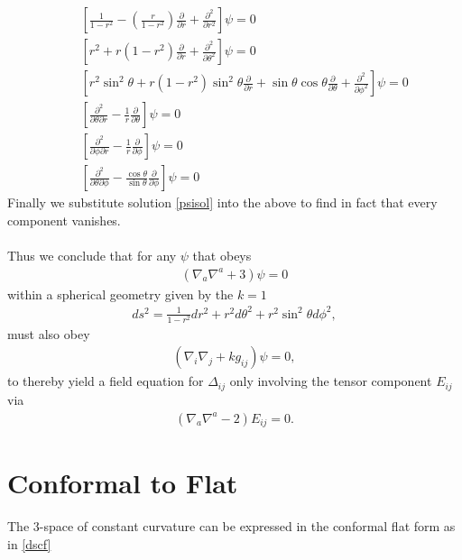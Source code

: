 \documentclass[10pt,letterpaper]{article}
\numberwithin{equation}{section}
\begin{document}
\begin{eqnarray}
&&\left[ \frac{1}{1-r^2}- \left(\frac{r}{1-r^2}\right)\frac{\partial}{\partial r} + \frac{\partial^2}{\partial r^2}\right]\psi
=0
\nonumber\\
&& \left[ r^2+r(1-r^2)\frac{\partial}{\partial r}+\frac{\partial^2}{\partial\theta^2}\right]\psi =0
\nonumber\\
&& \left[ r^2\sin^2\theta+r(1-r^2)\sin^2\theta\frac{\partial}{\partial r} + \sin\theta\cos\theta \frac{\partial}{\partial\theta} + \frac{\partial^2}{\partial \phi^2}\right]\psi=0
\nonumber\\
&& \left[ \frac{\partial^2}{\partial\theta\partial r}-\frac{1}{r}\frac{\partial}{\partial \theta}\right]\psi=0
\nonumber\\
&& \left[ \frac{\partial^2}{\partial\phi\partial r}-\frac{1}{r}\frac{\partial}{\partial \phi}\right]\psi=0
\nonumber\\
&& \left[ \frac{\partial^2}{\partial\theta\partial\phi}-\frac{\cos\theta}{\sin\theta}\frac{\partial}{\partial \phi}\right]\psi =0
\end{eqnarray}
Finally we substitute solution \eqref{psisol} into the above to find in fact that every component vanishes. 
\\
\\Thus we conclude that for any $\psi$ that obeys
\begin{eqnarray}
(\nabla_a\nabla^a+3)\psi=0
\end{eqnarray}
within a spherical geometry given by the $k=1$ 
\begin{eqnarray}
ds^2 = \frac{1}{1-r^2}dr^2+r^2d\theta^2 +r^2\sin^2\theta d\phi^2,
\end{eqnarray}
must also obey
\begin{eqnarray}
(\nabla_i\nabla_j +k g_{ij})\psi=0,
\end{eqnarray}
to thereby yield a field equation for $\Delta_{ij}$ only involving the tensor component $E_{ij}$ via
\begin{eqnarray}
(\nabla_a\nabla^a -2)E_{ij} =0. 
\end{eqnarray}

\newpage

\section{Conformal to Flat}

The 3-space of constant curvature can be expressed in the conformal flat form as in \eqref{dscf}
\end{document}
